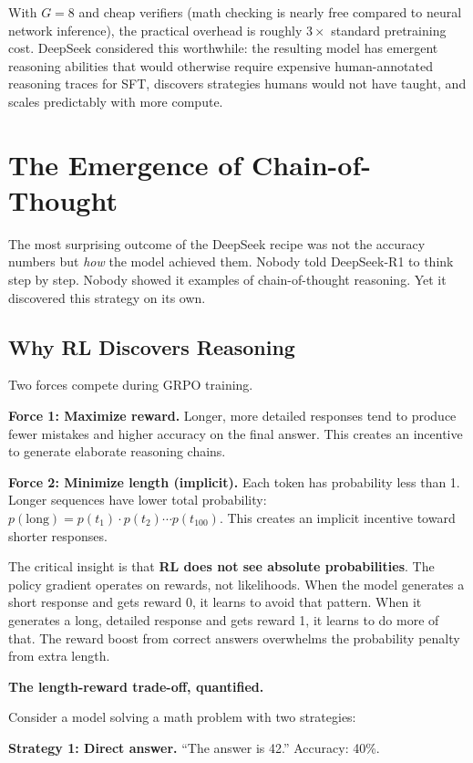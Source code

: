 \begin{chapterenv}
With $G = 8$ and cheap verifiers (math checking is nearly free compared to neural network inference), the practical overhead is roughly $3\times$ standard pretraining cost. DeepSeek considered this worthwhile: the resulting model has emergent reasoning abilities that would otherwise require expensive human-annotated reasoning traces for SFT, discovers strategies humans would not have taught, and scales predictably with more compute.

\section{The Emergence of Chain-of-Thought}

The most surprising outcome of the DeepSeek recipe was not the accuracy numbers but \textit{how} the model achieved them. Nobody told DeepSeek-R1 to think step by step. Nobody showed it examples of chain-of-thought reasoning. Yet it discovered this strategy on its own.

\subsection{Why RL Discovers Reasoning}

Two forces compete during GRPO training.

\textbf{Force 1: Maximize reward.} Longer, more detailed responses tend to produce fewer mistakes and higher accuracy on the final answer. This creates an incentive to generate elaborate reasoning chains.

\textbf{Force 2: Minimize length (implicit).} Each token has probability less than 1. Longer sequences have lower total probability: $p(\text{long}) = p(t_1) \cdot p(t_2) \cdots p(t_{100})$. This creates an implicit incentive toward shorter responses.

The critical insight is that \textbf{RL does not see absolute probabilities}. The policy gradient operates on rewards, not likelihoods. When the model generates a short response and gets reward 0, it learns to avoid that pattern. When it generates a long, detailed response and gets reward 1, it learns to do more of that. The reward boost from correct answers overwhelms the probability penalty from extra length.

\textbf{The length-reward trade-off, quantified.}

Consider a model solving a math problem with two strategies:

\textbf{Strategy 1: Direct answer.} ``The answer is 42.'' Accuracy: 40\%.


\end{chapterenv}
